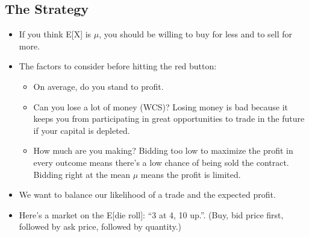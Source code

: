 \documentclass{article}
\begin{document}
\subsection{The Strategy}
\begin{itemize}
\item If you think E[X] is $\mu$, you should be willing to buy for less and to sell for more.
\item The factors to consider before hitting the red button:
\begin{itemize}
\item On average, do you stand to profit.
\item Can you lose a lot of money (WCS)? Losing money is bad because it keeps you from participating in great opportunities to trade in the future if your capital is depleted.
\item How much are you making? Bidding too low to maximize the profit in every outcome means there's a low chance of being sold the contract. Bidding right at the mean $\mu$ means the profit is limited.
\end{itemize}
\item We want to balance our likelihood of a trade and the expected profit.
\item Here's a market on the E[die roll]: ``3 at 4, 10 up.''. (Buy, bid price first, followed by ask price, followed by quantity.)
\end{itemize}
\end{document}
